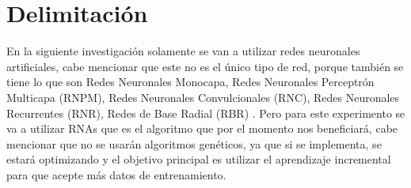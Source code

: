 \section{Delimitación}
\label{sec:delimitation}

    En la siguiente investigación solamente se van a utilizar redes neuronales artificiales, 
    cabe mencionar que este no es el único tipo de red, porque también se tiene lo que son Redes Neuronales Monocapa,
    Redes Neuronales Perceptrón Multicapa (RNPM), Redes Neuronales Convulcionales (RNC), Redes Neuronales Recurrentes (RNR),
    Redes de Base Radial (RBR) \cite{royo2021}. Pero para este experimento se va a utilizar RNAs que es el algoritmo que 
    por el momento nos beneficiar\'a, cabe mencionar que no se usar\'an algoritmos genéticos, ya que si se implementa, se estará
    optimizando y el objetivo principal es utilizar el aprendizaje incremental para que acepte más datos de entrenamiento.
